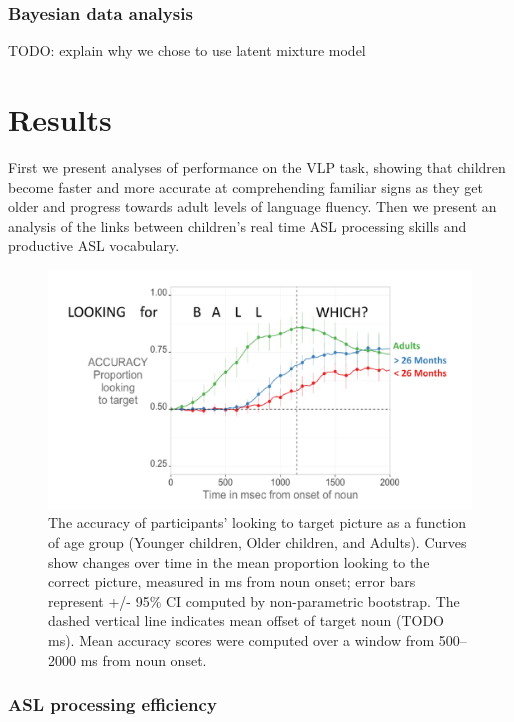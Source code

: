 \documentclass[12pt,]{article}
\begin{document}
\subsubsection{Bayesian data analysis}\label{bayesian-data-analysis}

TODO: explain why we chose to use latent mixture model

\section{Results}\label{results}

First we present analyses of performance on the VLP task, showing that
children become faster and more accurate at comprehending familiar signs
as they get older and progress towards adult levels of language fluency.
Then we present an analysis of the links between children's real time
ASL processing skills and productive ASL vocabulary.

\begin{figure}[htbp]
\centering
\includegraphics{Figs/profile plot png-1.pdf}
\caption{The accuracy of participants' looking to target picture as a
function of age group (Younger children, Older children, and Adults).
Curves show changes over time in the mean proportion looking to the
correct picture, measured in ms from noun onset; error bars represent
+/- 95\% CI computed by non-parametric bootstrap. The dashed vertical
line indicates mean offset of target noun (TODO ms). Mean accuracy
scores were computed over a window from 500--2000 ms from noun onset.}
\end{figure}

\subsubsection{ASL processing
efficiency}\label{asl-processing-efficiency}
\end{document}
